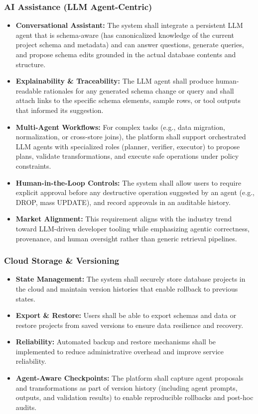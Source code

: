 \subsubsection*{AI Assistance (LLM Agent-Centric)}
\begin{itemize}
    \item \textbf{Conversational Assistant:} The system shall integrate a persistent LLM agent that is schema-aware (has canonicalized knowledge of the current project schema and metadata) and can answer questions, generate queries, and propose schema edits grounded in the actual database contents and structure.
    \item \textbf{Explainability \& Traceability:} The LLM agent shall produce human-readable rationales for any generated schema change or query and shall attach links to the specific schema elements, sample rows, or tool outputs that informed its suggestion.
    \item \textbf{Multi-Agent Workflows:} For complex tasks (e.g., data migration, normalization, or cross-store joins), the platform shall support orchestrated LLM agents with specialized roles (planner, verifier, executor) to propose plans, validate transformations, and execute safe operations under policy constraints.
    \item \textbf{Human-in-the-Loop Controls:} The system shall allow users to require explicit approval before any destructive operation suggested by an agent (e.g., DROP, mass UPDATE), and record approvals in an auditable history.
    \item \textbf{Market Alignment:} This requirement aligns with the industry trend toward LLM-driven developer tooling while emphasizing agentic correctness, provenance, and human oversight rather than generic retrieval pipelines.
\end{itemize}

\subsubsection*{Cloud Storage \& Versioning}
\begin{itemize}
    \item \textbf{State Management:} The system shall securely store database projects in the cloud and maintain version histories that enable rollback to previous states.
    \item \textbf{Export \& Restore:} Users shall be able to export schemas and data or restore projects from saved versions to ensure data resilience and recovery.
    \item \textbf{Reliability:} Automated backup and restore mechanisms shall be implemented to reduce administrative overhead and improve service reliability.
    \item \textbf{Agent-Aware Checkpoints:} The platform shall capture agent proposals and transformations as part of version history (including agent prompts, outputs, and validation results) to enable reproducible rollbacks and post-hoc audits.
\end{itemize}
